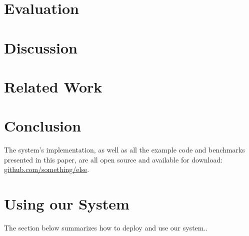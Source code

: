 \documentclass[sigplan, review, screen, 10pt]{acmart}
\begin{document}
\section{Evaluation}
\label{eval}

\section{Discussion}
\label{discussion}


\section{Related Work}
\label{related}

\section{Conclusion}
\label{conclusion}

The system's implementation, as well as all the example code and benchmarks presented in this paper, are all open source and available for download:
\href{https://github.com/something/else}{github.com/something/else}.

\begin{acks}

\end{acks}

{\small

}

\appendix

\section{Using our System}
\label{using-apx}

The section below summarizes how to deploy and use our system..
\end{document}
